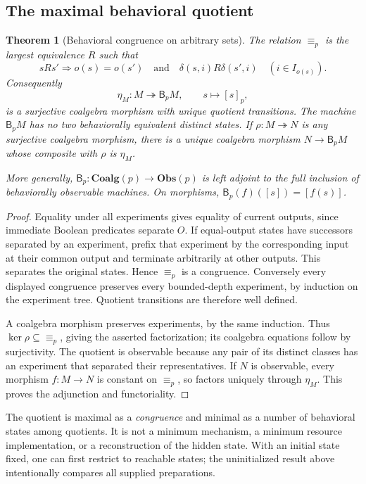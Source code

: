 \documentclass[11pt]{article}
\newtheorem{theorem}{Theorem}[section]
\theoremstyle{definition}
\theoremstyle{remark}\newtheorem{remark}[theorem]{Remark}
\newcommand{\Beh}{\mathsf B}
\newcommand{\Coalg}{\mathbf{Coalg}}
\newcommand{\Obs}{\mathbf{Obs}}
\begin{document}
\subsection{The maximal behavioral quotient}
\begin{theorem}[Behavioral congruence on arbitrary sets]\label{p:thm:quotient}
The relation $\equiv_p$ is the largest equivalence $R$ such that
\[
 sRs'\Longrightarrow o(s)=o(s')\quad\text{and}\quad
 \delta(s,i)R\delta(s',i)\quad(i\in I_{o(s)}).
\]
Consequently
\[
 \eta_M:M\twoheadrightarrow\Beh_pM,
 \qquad s\longmapsto[s]_p,
\]
is a surjective coalgebra morphism with unique quotient transitions.
The machine $\Beh_pM$ has no two behaviorally equivalent distinct
states. If $\rho:M\twoheadrightarrow N$ is any surjective coalgebra morphism,
there is a unique coalgebra morphism $N\to\Beh_pM$ whose composite with
$\rho$ is $\eta_M$.

More generally, $\Beh_p:\Coalg(p)\to\Obs(p)$ is left adjoint to the full
inclusion of behaviorally observable machines. On morphisms,
$\Beh_p(f)([s])=[f(s)]$.
\end{theorem}
\begin{proof}
Equality under all experiments gives equality of current outputs, since
immediate Boolean predicates separate $O$. If equal-output states have
successors separated by an experiment, prefix that experiment by the
corresponding input at their common output and terminate arbitrarily at
other outputs. This separates the original states. Hence $\equiv_p$ is a
congruence. Conversely every displayed congruence preserves every bounded-depth
experiment, by induction on the experiment tree. Quotient transitions are
therefore well defined.

A coalgebra morphism preserves experiments, by the same induction. Thus
$\ker\rho\subseteq\equiv_p$, giving the asserted factorization; its coalgebra
equations follow by surjectivity. The quotient is observable because any
pair of its distinct classes has an experiment that separated their
representatives. If $N$ is observable, every morphism $f:M\to N$ is constant
on $\equiv_p$, so factors uniquely through $\eta_M$. This proves the
adjunction and functoriality.
\end{proof}
The quotient is maximal as a \emph{congruence} and minimal as a number of
behavioral states among quotients. It is not a minimum mechanism, a minimum
resource implementation, or a reconstruction of the hidden state. With an
initial state fixed, one can first restrict to reachable states; the
uninitialized result above intentionally compares all supplied preparations.
\end{document}
